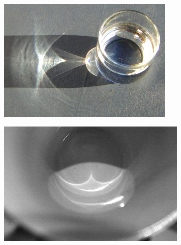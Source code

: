 \begin{figure}
\begin{fullwidth}
	\begin{subfigure}[b]{0.26\thewidth}
		\includegraphics[width=1.\textwidth]{figures/intro/Caustics-1}
	\end{subfigure}
	\begin{subfigure}[b]{0.2758\thewidth}
		\includegraphics[width=1.\textwidth]{figures/intro/Caustics-2}
	\end{subfigure}	
	\begin{subfigure}[b]{0.19\thewidth}

\end{subfigure}
\end{fullwidth}
\end{figure}
